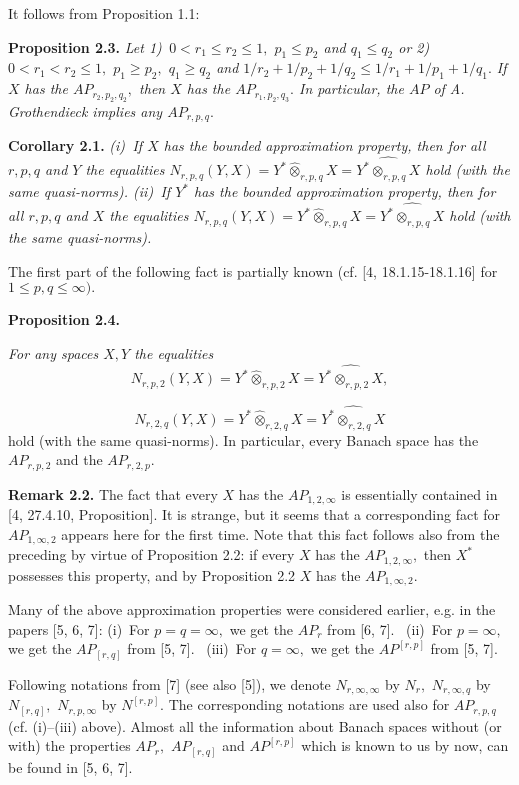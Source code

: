 It follows from Proposition 1.1:
\smallskip

\textbf{Proposition 2.3.} {\it
Let
1)\,
$0<r_1\le r_2\le1,$ $p_1\le p_2$ and $q_1\le q_2$
or
2)\,
 $0<r_1< r_2\le1,$ $p_1\ge p_2,$ $q_1\ge q_2$ and
 $1/r_2+1/p_2+1/q_2\le 1/r_1+1/p_1+1/q_1.$
If
$X$ has the $AP_{r_2,p_2,q_2},$ then $X$ has the $AP_{r_1,p_2,q_3}.$
In particular, the $AP$ of A. Grothendieck implies any $AP_{r,p,q}.$
}
\smallskip

\textbf{Corollary 2.1.}    {\it
(i)\,
If $X$ has the bounded approximation property, then for all $r,p,q$ and $Y$
the equalities
$N_{r,p,q}(Y,X)= Y^*\widehat\otimes_{r,p,q} X = \widehat{Y^*\otimes_{r,p,q} X}$
hold (with the same quasi-norms).
  (ii)\,
If $Y^*$ has the bounded approximation property, then for all $r,p,q$ and $X$
the equalities
$N_{r,p,q}(Y,X)= Y^*\widehat\otimes_{r,p,q} X = \widehat{Y^*\otimes_{r,p,q} X}$
hold (with the same quasi-norms).
}
                        \smallskip


The first part of the following fact is partially known
(cf. [4, 18.1.15-18.1.16] for $1\le p,q\le\infty).$
\smallskip

 \textbf{Proposition 2.4.} {\it
 For any  spaces $X,Y$ the equalities
 $$
    N_{r,p,2}(Y,X)= Y^*\widehat\otimes_{r,p,2} X = \widehat{Y^*\otimes_{r,p,2} X}, $$

$$    N_{r,2,q}(Y,X)= Y^*\widehat\otimes_{r,2,q} X = \widehat{Y^*\otimes_{r,2,q} X}
 $$
 hold (with the same quasi-norms).
 In particular, every Banach space has the $AP_{r,p,2}$ and the $AP_{r,2,p}.$
 }
  \smallskip

\textbf{Remark 2.2.}
The fact that every $X$ has the $AP_{1,2,\infty}$ is essentially contained in
[4, 27.4.10, Proposition]. It is strange, but it seems that
a corresponding fact for $AP_{1,\infty,2}$ appears here for the first time.
Note that this fact follows also from the preceding by virtue of Proposition 2.2:
if every $X$ has the $AP_{1,2,\infty},$ then $X^*$ possesses this property,
and by Proposition 2.2 $X$ has the $AP_{1,\infty,2}.$

  \smallskip

Many of the above approximation properties were consider\-ed earlier, e.g. in the
papers [5, 6, 7]:
(i)\,
For $p=q=\infty,$ we get the $AP_r$ from [6, 7].  \,
(ii)\,
For $p=\infty,$ we get the $AP_{[r,q]}$ from [5, 7].   \,
(iii)\,
For $q=\infty,$ we get the $AP^{[r,p]}$ from [5, 7].

\smallskip

Following notations from [7] (see also [5]), we denote
$N_{r,\infty,\infty}$ by $N_r,$
$N_{r,\infty,q}$ by $N_{[r,q]},$
$N_{r,p,\infty}$ by $N^{[r,p]}.$
The corresponding notations are used also for $AP_{r,p,q}$
(cf.  (i)--(iii) above).
Almost all the information about Banach spaces without (or with) the properties
 $AP_r,$ $AP_{[r,q]}$ and  $AP^{[r,p]}$ which is known to us by now,
 can be found in [5, 6, 7].
                \medskip


